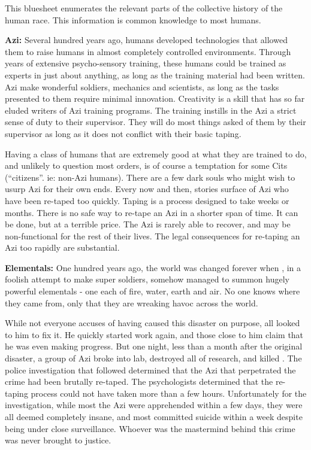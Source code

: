 \documentclass[blue]{elementals}
\begin{document}
\name{\bTest{}}

This bluesheet enumerates the relevant parts of the collective history of the human race. This information is common knowledge to most humans.

{\bf Azi:} %
Several hundred years ago, humans developed technologies that allowed them to raise humans in almost completely controlled environments. Through years of extensive psycho-sensory training, these humans could be trained as experts in just about anything, as long as the training material had been written. Azi make wonderful soldiers, mechanics and scientists, as long as the tasks presented to them require minimal innovation. Creativity is a skill that has so far eluded writers of Azi training programs. The training instills in the Azi a strict sense of duty to their supervisor. They will do most things asked of them by their supervisor as long as it does not conflict with their basic taping.

Having a class of humans that are extremely good at what they are trained to do, and unlikely to question most orders, is of course a temptation for some Cits (``citizens''. ie: non-Azi humans). There are a few dark souls who might wish to usurp Azi for their own ends. Every now and then, stories surface of Azi who have been re-taped too quickly.  Taping is a process designed to take weeks or months. There is no safe way to re-tape an Azi in a shorter span of time. It can be done, but at a terrible price. The Azi is rarely able to recover, and may be non-functional for the rest of their lives.  The legal consequences for re-taping an Azi too rapidly are substantial. %

{\bf Elementals:}
One hundred years ago, the world was changed forever when \cGrandfather{}, in a foolish attempt to make super soldiers, somehow managed to summon hugely powerful elementals - one each of fire, water, earth and air. No one knows where they came from, only that they are wreaking havoc across the world. 

While not everyone accuses \cGrandfather{} of having caused this disaster on purpose, all looked to him to fix it. He quickly started work again, and those close to him claim that he was even making progress. But one night, less than a month after the original disaster, a group of Azi broke into \cGrandfather{\their} lab, destroyed all of \cGrandfather{\their} research, and killed \cGrandfather{\them}. The police investigation that followed determined that the Azi that perpetrated the crime had been brutally re-taped. The psychologists determined that the re-taping process could not have taken more than a few hours. Unfortunately for the investigation, while most the Azi were apprehended within a few days, they were all deemed completely insane, and most committed suicide within a week despite being under close surveillance. Whoever was the mastermind behind this crime was never brought to justice.
\end{document}

